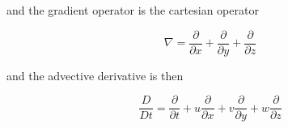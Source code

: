and the gradient operator is the cartesian operator

\[\nabla = \frac{\partial }{\partial x} + \frac{\partial }{\partial y} + \frac{\partial }{\partial z}\]

and the advective derivative is then

\[\frac{D }{Dt} = \frac{\partial }{\partial t} + u\frac{\partial }{\partial x} + v\frac{\partial }{\partial y} + w\frac{\partial }{\partial z}\]
